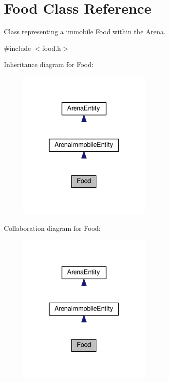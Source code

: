 \hypertarget{classFood}{}\section{Food Class Reference}
\label{classFood}


Class representing a immobile \hyperlink{classFood}{Food} within the \hyperlink{classArena}{Arena}.  




{\ttfamily \#include $<$food.\+h$>$}



Inheritance diagram for Food\+:\nopagebreak
\begin{figure}[H]
\begin{center}
\leavevmode
\includegraphics[width=187pt]{classFood__inherit__graph}
\end{center}
\end{figure}


Collaboration diagram for Food\+:\nopagebreak
\begin{figure}[H]
\begin{center}
\leavevmode
\includegraphics[width=187pt]{classFood__coll__graph}
\end{center}
\end{figure}
